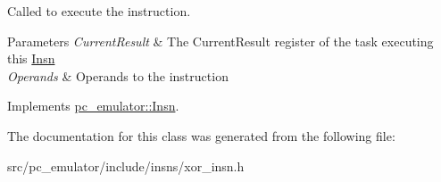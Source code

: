 Called to execute the instruction. 


\begin{DoxyParams}{Parameters}
{\em Current\+Result} & The Current\+Result register of the task executing this \hyperlink{classpc__emulator_1_1Insn}{Insn} \\
\hline
{\em Operands} & Operands to the instruction \\
\hline
\end{DoxyParams}


Implements \hyperlink{classpc__emulator_1_1Insn_a103d27030e872a799e313df16c1f3d66}{pc\+\_\+emulator\+::\+Insn}.



The documentation for this class was generated from the following file\+:\begin{DoxyCompactItemize}
\item 
src/pc\+\_\+emulator/include/insns/xor\+\_\+insn.\+h\end{DoxyCompactItemize}
